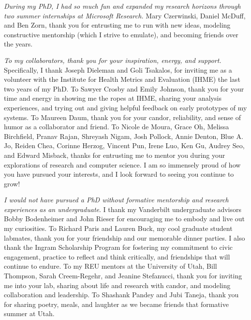 \textit{During my PhD, I had so much fun and expanded my research horizons
through two summer internships at Microsoft Research.} Mary Czerwinski, Daniel
McDuff, and Ben Zorn, thank you for entrusting me to run with new ideas,
modeling constructive mentorship (which I strive to emulate), and becoming
friends over the years. 

\textit{To my collaborators, thank you for your inspiration, energy, and support.}
Specifically, I thank Joseph Dieleman and Goli Tsakalos, for inviting me as
a volunteer with the Institute for Health Metrics and Evaluation (IHME) the
last two years of my PhD. To Sawyer Crosby and Emily Johnson, thank you for
your time and energy in showing me the ropes at IHME, sharing your analysis
experiences, and trying out and giving helpful feedback on early prototypes
of my systems. To Maureen Daum, thank you for your candor, reliability, and
sense of humor as a collaborator and friend. To Nicole de Moura, Grace Oh,
Melissa Birchfield, Pranav Rajan, Shreyash Nigam, Josh Pollock, Annie
Denton, Blue A. Jo, Reiden Chea, Corinne Herzog, Vincent Pun, Irene Luo, Ken
Gu, Audrey Seo, and Edward Misback, thanks for entrusting me to mentor you during your
explorations of research and computer science. I am so immensely proud of
how you have pursued your interests, and I look forward to seeing
you continue to grow!

\textit{I would not have pursued a PhD without formative mentorship and research
experiences as an undergraduate}. I thank my Vanderbilt undergraduate advisors Bobby
Bodenheimer and John Rieser for encouraging me to embody and live out my
curiosities. To Richard Paris and Lauren Buck, my cool
graduate student labmates, thank you for your friendship and our memorable
dinner parties. I also thank the Ingram Scholarship Program for fostering my
commitment to civic engagement, practice to reflect and think critically, and
friendships that will continue to endure. To my REU mentors at the
University of Utah, Bill Thompson, Sarah Creem-Regehr, and Jeanine Stefanucci,
thank you for inviting me into your lab, sharing about life and research with
candor, and modeling collaboration and leadership. To Shashank Pandey and Jubi
Taneja, thank you for sharing poetry, meals, and laughter as we became friends
that formative summer at Utah.


